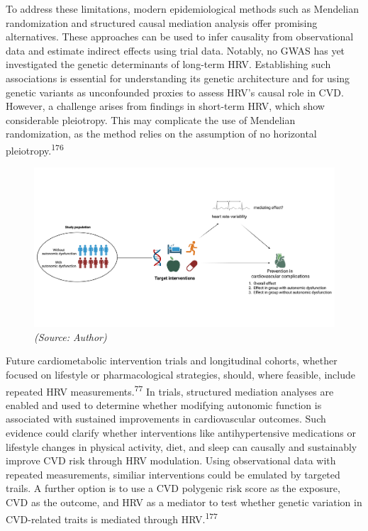 \documentclass[
  a4paper,
  headsepline=true,
  open=any]{scrbook}
\begin{document}
To address these limitations, modern epidemiological methods such as
Mendelian randomization and structured causal mediation analysis offer
promising alternatives. These approaches can be used to infer causality
from observational data and estimate indirect effects using trial data.
Notably, no GWAS has yet investigated the genetic determinants of
long-term HRV. Establishing such associations is essential for
understanding its genetic architecture and for using genetic variants as
unconfounded proxies to assess HRV's causal role in CVD. However, a
challenge arises from findings in short-term HRV, which show
considerable pleiotropy. This may complicate the use of Mendelian
randomization, as the method relies on the assumption of no horizontal
pleiotropy.\textsuperscript{176}

\begin{figure}

\begin{minipage}[t]{\linewidth}

{\centering 

\includegraphics[width=6in,height=\textheight]{images/Mediation_HRV_1.png}
\emph{(Source: Author)}

}

\end{minipage}%

\end{figure}

Future cardiometabolic intervention trials and longitudinal cohorts,
whether focused on lifestyle or pharmacological strategies, should,
where feasible, include repeated HRV measurements.\textsuperscript{77}
In trials, structured mediation analyses are enabled and used to
determine whether modifying autonomic function is associated with
sustained improvements in cardiovascular outcomes. Such evidence could
clarify whether interventions like antihypertensive medications or
lifestyle changes in physical activity, diet, and sleep can causally and
sustainably improve CVD risk through HRV modulation. Using observational
data with repeated measurements, similiar interventions could be
emulated by targeted trails. A further option is to use a CVD polygenic
risk score as the exposure, CVD as the outcome, and HRV as a mediator to
test whether genetic variation in CVD-related traits is mediated through
HRV.\textsuperscript{177}
\end{document}
